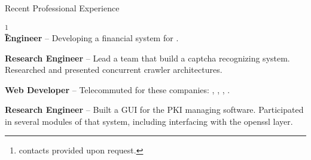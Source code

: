 \begin{rubric}{Recent Professional Experience}{
    \footnote{contacts provided upon request.}  \\

    \entry*[2012 - Present] \textbf{Engineer} -- Developing a
    financial system for .

    \entry*[2010 - 2012] \textbf{Research Engineer} -- Lead a team
    that build a captcha recognizing system. Researched and presented
    concurrent crawler architectures.

    \entry*[2007-2009] \textbf{Web Developer} -- Telecommuted for these companies:
    ,
    ,
    ,
    .

    \entry*[2005 - 2007] \textbf{Research Engineer} --
    Built a GUI for the PKI managing software. Participated in several modules of that system, including interfacing with the openssl layer.

  }
\end{rubric}
